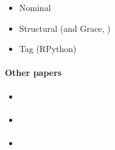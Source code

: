 \begin{itemize}
    \item Nominal \cite{Muehlboeck2017}
    \item Structural \cite{Richards2017} (and Grace, \cite{Boyland2014})
    \item Tag (RPython) \cite{Greenman2017}
\end{itemize}

\paragraph{Other papers}


\begin{itemize}
    \item \cite{Bloom2009}
    \item \cite{Castagna2017}
    \item \cite{Stulova2016}
\end{itemize}
